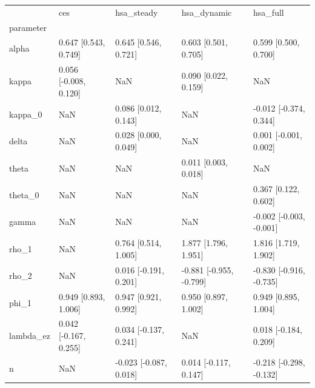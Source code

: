 \begin{tabular}{lllll}
\toprule
 & ces & hsa\_steady & hsa\_dynamic & hsa\_full \\
parameter &  &  &  &  \\
\midrule
alpha & 0.647 [0.543, 0.749] & 0.645 [0.546, 0.721] & 0.603 [0.501, 0.705] & 0.599 [0.500, 0.700] \\
kappa & 0.056 [-0.008, 0.120] & NaN & 0.090 [0.022, 0.159] & NaN \\
kappa\_0 & NaN & 0.086 [0.012, 0.143] & NaN & -0.012 [-0.374, 0.344] \\
delta & NaN & 0.028 [0.000, 0.049] & NaN & 0.001 [-0.001, 0.002] \\
theta & NaN & NaN & 0.011 [0.003, 0.018] & NaN \\
theta\_0 & NaN & NaN & NaN & 0.367 [0.122, 0.602] \\
gamma & NaN & NaN & NaN & -0.002 [-0.003, -0.001] \\
rho\_1 & NaN & 0.764 [0.514, 1.005] & 1.877 [1.796, 1.951] & 1.816 [1.719, 1.902] \\
rho\_2 & NaN & 0.016 [-0.191, 0.201] & -0.881 [-0.955, -0.799] & -0.830 [-0.916, -0.735] \\
phi\_1 & 0.949 [0.893, 1.006] & 0.947 [0.921, 0.992] & 0.950 [0.897, 1.002] & 0.949 [0.895, 1.004] \\
lambda\_ez & 0.042 [-0.167, 0.255] & 0.034 [-0.137, 0.241] & NaN & 0.018 [-0.184, 0.209] \\
n & NaN & -0.023 [-0.087, 0.018] & 0.014 [-0.117, 0.147] & -0.218 [-0.298, -0.132] \\
\bottomrule
\end{tabular}
